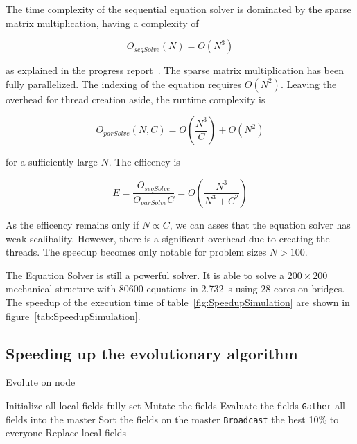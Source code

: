 \documentclass[12pt]{article}
\begin{document}
The time complexity of the sequential equation solver is dominated by the sparse matrix multiplication, having a complexity of 

\begin{equation}
    O_\mathit{seqSolve}(N) = O(N^3) 
\end{equation}

as explained in the progress report~\cite{ProgressReport}. The sparse matrix multiplication has been fully parallelized. The indexing of the equation requires $O(N^2)$. Leaving the overhead for thread creation aside, the runtime complexity is 

\begin{equation}
    O_\mathit{parSolve}(N, C) = O \left(\frac{N^3}{C}\right) + O(N^2)
\end{equation}

for a sufficiently large $N$. The efficency is

\begin{equation}
    E = \frac{O_\mathit{seqSolve}}{O_\mathit{parSolve} C} = O\left(\frac{N^3}{N^3 + C^2}\right)
\end{equation}

As the efficency remains only if $N \propto C$, we can asses that the equation solver has weak scalibality. However, there is a significant overhead due to creating the threads. The speedup becomes only notable for problem sizes $N > 100$.

The Equation Solver is still a powerful solver. It is able to solve a $200 \times 200$ mechanical structure with 80600 equations in \SI{2.732}{\second} using 28 cores on bridges. The speedup of the execution time of table~\ref{fig:SpeedupSimulation} are shown in figure~\ref{tab:SpeedupSimulation}.

\subsection{Speeding up the evolutionary algorithm}

\begin{algorithm}[p]
    \caption{Evolute on node}
    \begin{algorithmic}
        \STATE Initialize all local fields fully set
            \STATE Mutate the fields
            \STATE Evaluate the fields
            \STATE \texttt{Gather} all fields into the master
            \STATE Sort the fields on the master
            \STATE \texttt{Broadcast} the best 10\% to everyone
            \STATE Replace local fields
        \ENDFOR
    \end{algorithmic}
    \label{alg:Evolution}
\end{algorithm}
\end{document}
